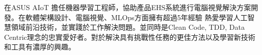 

\begin{cvparagraph}

在ASUS AIoT 擔任機器學習工程師，協助產品EHS系統進行電腦視覺解決方案開發。在軟體架構設計、電腦視覺、MLOps方面擁有超過5年經驗
熱愛學習人工智慧領域前沿技術，並實踐於工作解決問題。並同時是Clean Code, TDD, Data Centric理念的忠實愛好者。對於解決具有挑戰性任務的更佳方法以及學習新技術和工具有濃厚的興趣。

\end{cvparagraph}
